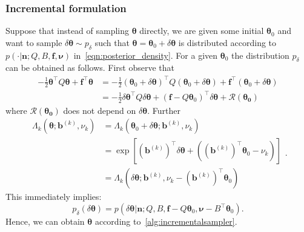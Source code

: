 \documentclass[11pt]{article}
\renewcommand{\vec}[1]{\boldsymbol{#1}}
\begin{document}
\subsubsection{Incremental formulation}
Suppose that instead of sampling $\vec{\theta}$ directly, we are given some initial $\vec{\theta}_0$ and want to sample $\delta\vec{\theta}\sim p_\delta$ such that $\vec{\theta}=\vec{\theta}_0+\delta\vec{\theta}$ is distributed according to $p(\cdot|\vec{n};Q,B,\vec{f},\vec{\nu})$ in~\eqref{eqn:posterior_density}. For a given $\vec{\theta}_0$ the distribution $p_\delta$ can be obtained as follows. First observe that
\begin{equation}
    \begin{aligned}
    -\frac{1}{2} \vec{\theta}^\top Q \vec{\theta} + \vec{f}^\top \vec{\theta} &= -\frac{1}{2} (\vec{\theta}_0+\delta\vec{\theta})^\top Q (\vec{\theta}_0+\delta\vec{\theta}) + \vec{f}^\top (\vec{\theta}_0+\delta\vec{\theta})\\
    &= -\frac{1}{2} \delta\vec{\theta}^\top Q \delta\vec{\theta} + (\vec{f}-Q\vec{\theta}_0)^\top \delta\vec{\theta} + \mathcal{R}(\vec{\theta_0})
    \end{aligned}
\end{equation}
where $\mathcal{R}(\vec{\theta_0})$ does not depend on $\delta\vec{\theta}$. Further
\begin{equation}
    \begin{aligned}
\Lambda_k(\vec{\theta};\vec{b}^{(k)},\nu_k) &= \Lambda_k(\vec{\theta}_0+\delta\vec{\theta};\vec{b}^{(k)},\nu_k) \\
&=\exp\left[(\vec{b}^{(k)})^\top \delta \vec{\theta} + \left((\vec{b}^{(k)})^\top\vec{\theta}_0-\nu_k\right)\right]\\
&= \Lambda_k(\delta \vec{\theta};\vec{b}^{(k)},\nu_k - (\vec{b}^{(k)})^\top\vec{\theta}_0)
\end{aligned}.
\end{equation}
This immediately implies:
\begin{equation}
    p_\delta(\delta\vec{\theta}) = p(\delta\vec{\theta}|\vec{n};Q,B,\vec{f}-Q\vec{\theta}_0,\vec{\nu}-B^\top\vec{\theta}_0).\label{eqn:incremental_probability}
\end{equation}
Hence, we can obtain $\vec{\theta}$ according to~\cref{alg:incrementalsampler}.
\end{document}
